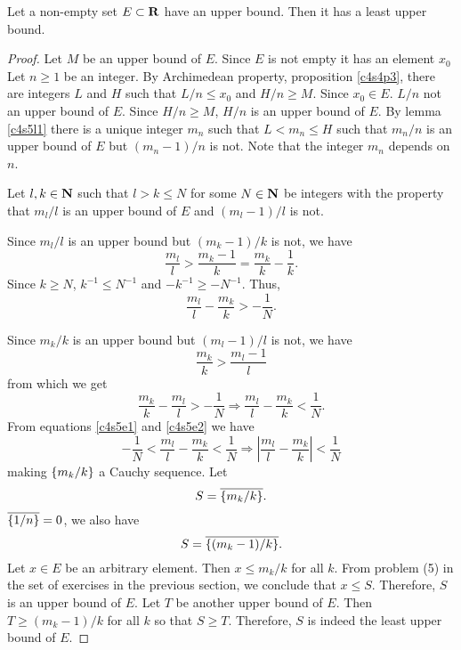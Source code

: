 \begin{prop}\label{c4s5p1}
Let a non-empty set $E \subset \mathbf{R}$ have an upper bound. Then it has a 
least upper bound.
\end{prop}
\begin{proof}
Let $M$ be an upper bound of $E$. Since $E$ is not empty it has an element
$x_0$ Let $n \ge 1$ be an integer. By Archimedean property, proposition
\ref{c4s4p3}, there are integers $L$ and $H$ such that $L/n \le x_0$ and
$H/n \ge M$. Since $x_0 \in E$. $L/n$ not an upper bound of $E$. Since
$H/n \ge M$, $H/n$ is an upper bound of $E$. By lemma \ref{c4s5l1} there is
a unique integer $m_n$ such that $L < m_n \le H$ such that $m_n/n$ is 
an upper bound of $E$ but $(m_n - 1)/n$ is not. Note that the integer
$m_n$ depends on $n$.

Let $l, k \in \mathbf{N}$ such that $l > k \le N$ for some $N \in \mathbf{N}$ be
integers with the property that $m_l/l$ is an upper bound of $E$ and
$(m_l - 1)/l$ is not.

Since $m_l/l$ is an upper bound but $(m_k - 1)/k$ is not, we have
\[
\frac{m_l}{l} > \frac{m_k - 1}{k} = \frac{m_k}{k} - \frac{1}{k}.
\]
Since $k \ge N$, $k^{-1} \le N^{-1}$ and $-k^{-1} \ge -N^{-1}$. Thus,
\begin{equation}\label{c4s5e1}
\frac{m_l}{l} - \frac{m_k}{k} > -\frac{1}{N}.
\end{equation}

Since $m_k/k$ is an upper bound but $(m_l - 1)/l$ is not, we have
\[
\frac{m_k}{k} > \frac{m_l - 1}{l}
\]
from which we get
\begin{equation}\label{c4s5e2}
\frac{m_k}{k} - \frac{m_l}{l} > -\frac{1}{N} \Rightarrow 
\frac{m_l}{l} - \frac{m_k}{k} < \frac{1}{N}.
\end{equation}
From equations \eqref{c4s5e1} and \eqref{c4s5e2} we have
\begin{equation}\label{c4s5e3}
-\frac{1}{N} < \frac{m_l}{l} - \frac{m_k}{k} < \frac{1}{N}
\Rightarrow \left|\frac{m_l}{l} - \frac{m_k}{k}\right| < \frac{1}{N}
\end{equation}
making $\{m_k/k\}$ a Cauchy sequence. Let 
\begin{equation}\label{c4s5e4}
S = \overline{\{m_k/k\}}.
\end{equation}
$\overline{\{1/n\}} = 0$, we also have 
\begin{equation}\label{c4s5e5}
S = \overline{\{(m_k - 1)/k\}}.
\end{equation}
Let $x \in E$ be an arbitrary element. Then $x \le m_k/k$ for all $k$.
From problem (5) in the set of exercises in the previous section, we
conclude that $x \le S$. Therefore, $S$ is an upper bound of $E$. Let
$T$ be another upper bound of $E$. Then $T \ge (m_k - 1)/k$ for all $k$
so that $S \ge T$. Therefore, $S$ is indeed the least upper bound of $E$.
\end{proof}

